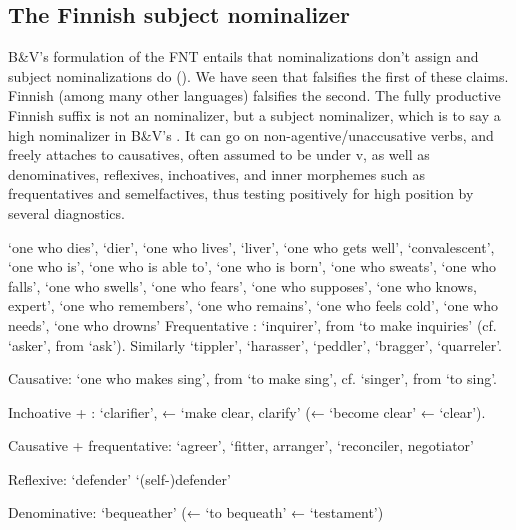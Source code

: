 \documentclass[output=paper,
modfonts
]{LSP/langsci}
\begin{document}
\subsection{The Finnish subject nominalizer }
\label{finnsectionja}
B\&V's formulation of the FNT entails that  nominalizations don't assign  and subject
nominalizations do ().  We have seen that  falsifies the first of these claims.
Finnish (among many other languages) falsifies the second.  The fully productive Finnish suffix
 is not an  nominalizer, but a subject nominalizer, which is to say a high
nominalizer in B\&V's .  It can go on non-agentive/unaccusative verbs, and freely
attaches to causatives, often assumed to be under v, as well as denominatives, reflexives,
inchoatives, and inner  morphemes such as frequentatives and semelfactives, thus testing
positively for high position by several diagnostics.
\begin{exe}
\ex
  \ea
   `one who dies', `dier',  `one who lives', `liver',
   `one who gets well', `convalescent',  `one who is',
   `one who is able to',  `one who is born', 
  `one who sweats',  `one who falls',  `one who swells',
   `one who fears',  `one who supposes',  `one
  who knows, expert',  `one who remembers',  `one who remains',
   `one who feels cold',  `one who needs', 
  `one who drowns'
\ex
	\ea Frequentative :  `inquirer', from  `to
  make inquiries' (cf.\  `asker', from  `ask'). Similarly
   `tippler',  `harasser', 
  `peddler',  `bragger',  `quarreler'.

	\ex Causative:  `one who makes sing', from  `to make
  sing', cf.  `singer', from  `to sing'.

	\ex Inchoative + :  `clarifier', ←  
  `make clear, clarify' (←  `become clear' ←  `clear'). 


	\ex Causative + frequentative:  `agreer',  `fitter, arranger',
   `reconciler, negotiator'


	\ex Reflexive:  `defender'   `(self-)defender'

	\ex Denominative:   `bequeather' (←  `to
  bequeath' ←   `testament')
	\z
\z
 \end{exe} 
\end{document}
